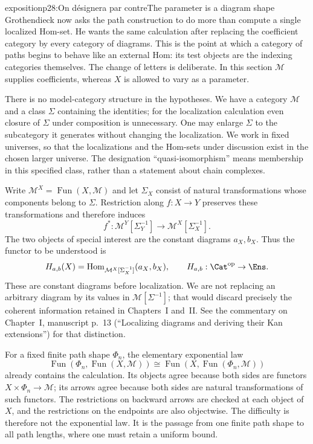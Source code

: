 \begin{dcomment}{exposition}{p28:On désignera par contre}{The parameter is a diagram shape}
Grothendieck now asks the path construction to do more than compute a single localized Hom-set. He wants the same calculation after replacing the coefficient category by every category of diagrams. This is the point at which a category of paths begins to behave like an external Hom: its test objects are the indexing categories themselves. The change of letters is deliberate. In this section $\mathcal M$ supplies coefficients, whereas $X$ is allowed to vary as a parameter.

There is no model-category structure in the hypotheses. We have a category $\mathcal M$ and a class $\Sigma$ containing the identities; for the localization calculation even closure of $\Sigma$ under composition is unnecessary. One may enlarge $\Sigma$ to the subcategory it generates without changing the localization. We work in fixed universes, so that the localizations and the Hom-sets under discussion exist in the chosen larger universe. The designation ``quasi-isomorphism'' means membership in this specified class, rather than a statement about chain complexes.

Write $\mathcal M^X=\operatorname{Fun}(X,\mathcal M)$ and let $\Sigma_X$ consist of natural transformations whose components belong to $\Sigma$. Restriction along $f:X\to Y$ preserves these transformations and therefore induces
\[
 f^*: \mathcal M^Y[\Sigma_Y^{-1}]
       \longrightarrow \mathcal M^X[\Sigma_X^{-1}].
\]
The two objects of special interest are the constant diagrams $a_X,b_X$. Thus the functor to be understood is
\[
 H_{a,b}(X)=\operatorname{Hom}_{\mathcal M^X[\Sigma_X^{-1}]}(a_X,b_X),
 \qquad H_{a,b}:\Cat^{\mathrm{op}}\to\Ens.
\]
These are constant diagrams before localization. We are not replacing an arbitrary diagram by its values in $\mathcal M[\Sigma^{-1}]$; that would discard precisely the coherent information retained in Chapters~I and~II. See the commentary on Chapter~I, manuscript p.~13 (``Localizing diagrams and deriving their Kan extensions'') for that distinction.

For a fixed finite path shape $\Phi_n$, the elementary exponential law
\[
 \operatorname{Fun}(\Phi_n,\operatorname{Fun}(X,\mathcal M))
 \cong\operatorname{Fun}(X,\operatorname{Fun}(\Phi_n,\mathcal M))
\]
already contains the calculation. Its objects agree because both sides are functors $X\times\Phi_n\to\mathcal M$; its arrows agree because both sides are natural transformations of such functors. The restrictions on backward arrows are checked at each object of $X$, and the restrictions on the endpoints are also objectwise. The difficulty is therefore not the exponential law. It is the passage from one finite path shape to all path lengths, where one must retain a uniform bound.
\end{dcomment}

